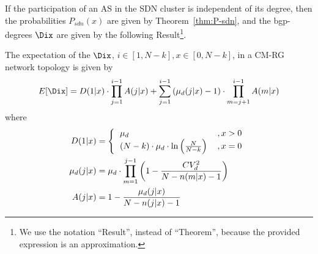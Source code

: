 If the participation of an AS in the SDN cluster is independent of its degree, then the probabilities $P_{sdn}(x)$ are given by Theorem~\ref{thm:P-sdn}, and the bgp-degrees $\Dix$ are given by the following Result\footnote{We use the notation ``Result'', instead of ``Theorem'', because the provided expression is an approximation.}.
\begin{result}
The expectation of the \bgp $\Dix$, $i\in[1,N-k], x\in[0,N-k]$, in a CM-RG network topology is given by
\begin{equation}\label{eq:Dix-CM}
E[\Dix] = D(1|x)\cdot \prod_{j=1}^{i-1}A(j|x) + \sum_{j=1}^{i-1}\left(\mu_{d}(j|x)-1\right)\cdot \prod_{m=j+1}^{i-1}A(m|x)
\end{equation}
where
\begin{align}\label{eq:CM-D1x}
D(1|x)&= \left\{
\begin{tabular}{ll}
$\mu_{d}$	& $, x>0$ \\
$(N-k)\cdot \mu_{d} \cdot \ln\left(\frac{N}{N-k}\right)$	& $, x=0$
\end{tabular}
\right.\\
\mu_{d}(j|x) 	&= \mu_{d}\cdot \prod_{m=1}^{j-1}\left(1-\frac{CV_{d}^{2}}{N-n(m|x)-1}\right) \label{eq:average-out-degree}\\
A(j|x) 			&= 1-\frac{\mu_{d}(j|x)}{N-n(j|x)-1}
\end{align}
\end{result}
